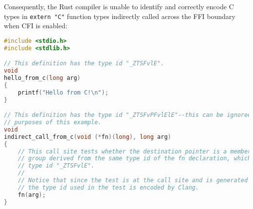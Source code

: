 \documentclass{article}
\begin{document}
Consequently, the Rust compiler is unable to identify and correctly encode C types in \texttt{extern "C"} function types indirectly called across the FFI boundary when CFI is enabled:

\begin{lstlisting}[language=C, caption={Example C library using C integer types and Clang encoding.}]
#include <stdio.h>
#include <stdlib.h>

// This definition has the type id "_ZTSFvlE".
void
hello_from_c(long arg)
{
    printf("Hello from C!\n");
}

// This definition has the type id "_ZTSFvPFvlElE"--this can be ignored for the
// purposes of this example.
void
indirect_call_from_c(void (*fn)(long), long arg)
{
    // This call site tests whether the destination pointer is a member of the
    // group derived from the same type id of the fn declaration, which has the
    // type id "_ZTSFvlE".
    //
    // Notice that since the test is at the call site and is generated by Clang,
    // the type id used in the test is encoded by Clang.
    fn(arg);
}
\end{lstlisting}
\end{document}
